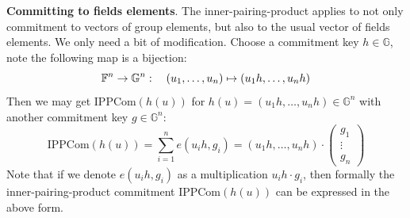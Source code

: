 \documentclass{article}
\begin{document}
\textbf{Committing to fields elements}. The inner-pairing-product applies to not only commitment to vectors of group elements, but also to the usual vector of fields elements. We only need a bit of modification. Choose a commitment key $h \in \mathbb{G}$, note the following map is a bijection:
\begin{equation*}
\mathbb{F}^n \rightarrow \mathbb{G}^n: \quad \left( u_1, \dots, u_n \right) \mapsto \left( u_1h, \dots, u_nh \right)
\end{equation*}
Then we may get $\text{IPPCom}(h(u))$ for $h(u) = (u_1h, \dots, u_nh) \in \mathbb{G}^n$ with another commitment key $g \in \mathbb{G}^n$: 
\begin{equation*}
\text{IPPCom}(h(u)) = \sum_{i = 1}^{n} e(u_ih, g_{i}) =  (u_1h, \dots, u_nh) \cdot 
\begin{pmatrix}
g_1 \\
\vdots \\
g_n
\end{pmatrix}
\end{equation*}
Note that if we denote $e(u_ih, g_i)$ as a multiplication $u_ih \cdot g_i$, then formally the inner-pairing-product commitment $\text{IPPCom}(h(u))$ can be expressed in the above form.
\end{document}
